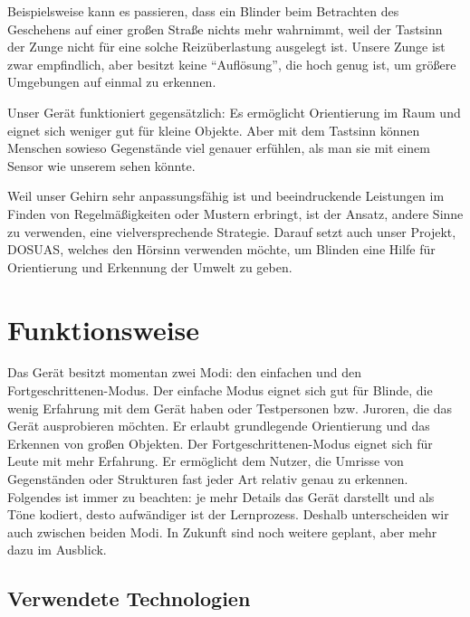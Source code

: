 \documentclass[a4paper,12pt,ngerman]{scrartcl}
\begin{document}
Beispielsweise kann es passieren, dass ein Blinder beim Betrachten des Geschehens auf 
einer großen Straße nichts mehr wahrnimmt, weil der Tastsinn der Zunge
nicht für eine solche Reizüberlastung ausgelegt ist. Unsere Zunge ist zwar empfindlich, aber besitzt keine
\enquote{Auflösung}, die hoch genug ist, um größere Umgebungen auf einmal zu erkennen.\par 
Unser Gerät funktioniert gegensätzlich: Es ermöglicht 
Orientierung im Raum und eignet sich weniger gut für kleine Objekte. Aber mit dem Tastsinn können Menschen
sowieso Gegenstände viel genauer erfühlen, als man sie mit einem Sensor wie unserem sehen könnte.\par
Weil unser Gehirn sehr anpassungsfähig ist und beeindruckende
Leistungen im Finden von Regelmäßigkeiten oder Mustern erbringt, ist der Ansatz,
andere Sinne zu verwenden, eine vielversprechende Strategie. Darauf setzt auch 
unser Projekt, DOSUAS, welches den Hörsinn verwenden möchte, um Blinden eine Hilfe
für Orientierung und Erkennung der Umwelt zu geben.

\newpage

\section{Funktionsweise}

Das Gerät besitzt momentan zwei Modi: den einfachen und den Fortgeschrittenen-Modus. Der einfache Modus 
eignet sich gut für Blinde, die wenig Erfahrung mit dem Gerät haben oder Testpersonen bzw. Juroren, die das
Gerät ausprobieren möchten. Er erlaubt grundlegende Orientierung und das Erkennen von großen Objekten. Der
Fortgeschrittenen-Modus eignet sich für Leute mit mehr Erfahrung. Er ermöglicht dem Nutzer, die Umrisse von 
Gegenständen oder Strukturen fast jeder Art relativ genau zu erkennen. Folgendes ist immer zu beachten: 
je mehr Details das Gerät darstellt und als Töne kodiert, desto aufwändiger ist der Lernprozess. 
Deshalb unterscheiden wir auch zwischen beiden Modi. In Zukunft sind noch weitere geplant, aber mehr dazu im 
Ausblick.

\subsection{Verwendete Technologien}
\end{document}
